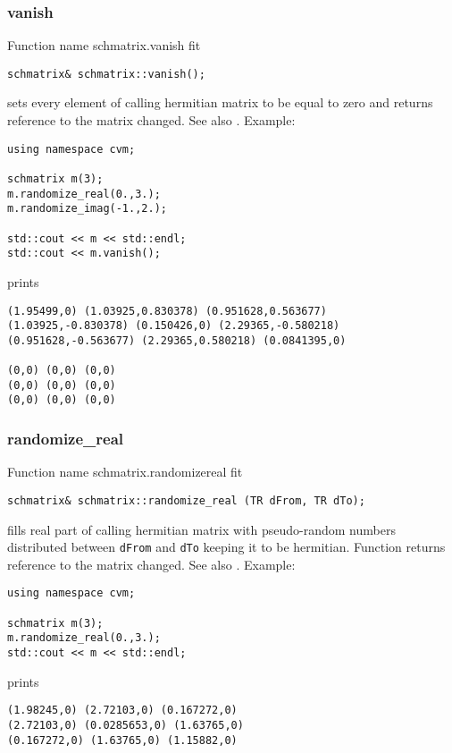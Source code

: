 \subsubsection{vanish}
Function%
\pdfdest name {schmatrix.vanish} fit
\begin{verbatim}
schmatrix& schmatrix::vanish();
\end{verbatim}
sets every element of  calling hermitian 
matrix to be equal to zero
and returns  reference to
the matrix changed.
See also .
Example:
\begin{Verbatim}
using namespace cvm;

schmatrix m(3);
m.randomize_real(0.,3.);
m.randomize_imag(-1.,2.);

std::cout << m << std::endl;
std::cout << m.vanish();
\end{Verbatim}
prints
\begin{Verbatim}
(1.95499,0) (1.03925,0.830378) (0.951628,0.563677)
(1.03925,-0.830378) (0.150426,0) (2.29365,-0.580218)
(0.951628,-0.563677) (2.29365,0.580218) (0.0841395,0)

(0,0) (0,0) (0,0)
(0,0) (0,0) (0,0)
(0,0) (0,0) (0,0)
\end{Verbatim}
\newpage



\subsubsection{randomize\_real}
Function%
\pdfdest name {schmatrix.randomizereal} fit
\begin{verbatim}
schmatrix& schmatrix::randomize_real (TR dFrom, TR dTo);
\end{verbatim}
fills  real part of  calling hermitian matrix with 
pseudo-random numbers distributed between
\verb"dFrom" and \verb"dTo" keeping it to be hermitian.
Function
returns  reference to the matrix changed.
See also
.
Example:
\begin{Verbatim}
using namespace cvm;

schmatrix m(3);
m.randomize_real(0.,3.);
std::cout << m << std::endl;
\end{Verbatim}
prints
\begin{Verbatim}
(1.98245,0) (2.72103,0) (0.167272,0)
(2.72103,0) (0.0285653,0) (1.63765,0)
(0.167272,0) (1.63765,0) (1.15882,0)
\end{Verbatim}
\newpage


